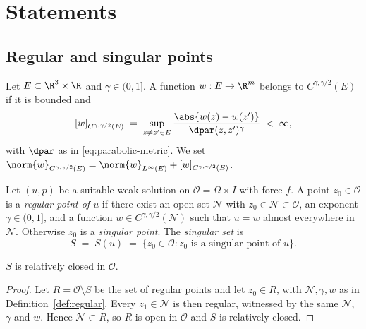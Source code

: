 \documentclass[11pt,reqno]{amsart}
\begin{document}
\section{Statements}\label{sec:theorems}

\subsection{Regular and singular points}\label{ss:regular}

\begin{definition}\label{def:holder}
Let $E\subset\R^{3}\times\R$ and $\gamma\in(0,1]$. A function
$w:E\to\R^{m}$ belongs to $C^{\gamma,\gamma/2}(E)$ if it is bounded and
\[
  [w]_{C^{\gamma,\gamma/2}(E)}
  \;=\;\sup_{z\neq z'\in E}\frac{\abs{w(z)-w(z')}}{\dpar(z,z')^{\gamma}}
  \;<\;\infty ,
\]
with $\dpar$ as in \eqref{eq:parabolic-metric}. We set
$\norm{w}_{C^{\gamma,\gamma/2}(E)}
 =\norm{w}_{L^{\infty}(E)}+[w]_{C^{\gamma,\gamma/2}(E)}$.
\end{definition}

\begin{definition}\label{def:regular}
Let $(u,p)$ be a suitable weak solution on $\mathcal{O}=\Omega\times I$ with
force $f$. A point $z_{0}\in\mathcal{O}$ is a \emph{regular point of $u$} if
there exist an open set $\mathcal{N}$ with $z_{0}\in\mathcal{N}\subset\mathcal{O}$,
an exponent $\gamma\in(0,1]$, and a function $w\in C^{\gamma,\gamma/2}(\mathcal{N})$
such that $u=w$ almost everywhere in $\mathcal{N}$. Otherwise $z_{0}$ is a
\emph{singular point}. The \emph{singular set} is
\[
  S \;=\; S(u)\;=\;\{z_{0}\in\mathcal{O}: z_{0}\text{ is a singular point of }u\} .
\]
\end{definition}

\begin{lemma}\label{lem:S-closed}
$S$ is relatively closed in $\mathcal{O}$.
\end{lemma}

\begin{proof}
Let $R=\mathcal{O}\setminus S$ be the set of regular points and let
$z_{0}\in R$, with $\mathcal{N},\gamma,w$ as in Definition~\ref{def:regular}.
Every $z_{1}\in\mathcal{N}$ is then regular, witnessed by the same
$\mathcal{N}$, $\gamma$ and $w$. Hence $\mathcal{N}\subset R$, so $R$ is open in
$\mathcal{O}$ and $S$ is relatively closed.
\end{proof}
\end{document}
